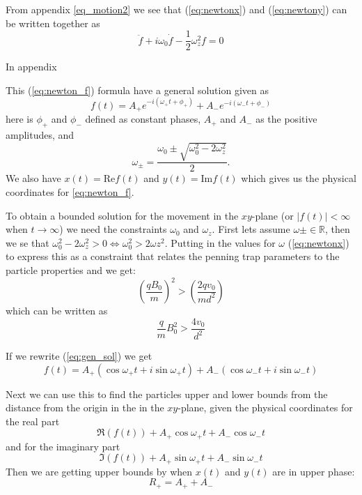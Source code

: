 \documentclass[english,notitlepage,reprint,nofootinbib]{revtex4-1}  %
\begin{document}
From appendix \ref{eq_motion2} we see that (\ref{eq:newtonx}) and (\ref{eq:newtony}) can be written together as 
\begin{equation} \label{eq:newton_f}
	\ddot{f} + i \omega_0 \dot{f} - \frac{1}{2} \omega_z^2 f = 0
\end{equation}

In appendix 


This (\ref{eq:newton_f}) formula have a general solution given as
\begin{equation} \label{eq:gen_sol}
	f(t) = A_+ e^{-i(\omega_+ t + \phi_+)} + A_- e^{-i(\omega_- t + \phi_-)}
\end{equation}
here is $\phi_+$ and $\phi_-$ defined as constant phases, $A_+$ and $A_-$ as the positive amplitudes, and 
\begin{equation*}
	\omega_\pm = \frac{\omega_0 \pm \sqrt{\omega_0^2 - 2\omega_z^2}}{2}.
\end{equation*}
We also have $x(t) = \text{Re} f(t)$ and $y(t) = \text{Im} f(t)$ which gives us the physical coordinates for \ref{eq:newton_f}.

To obtain a bounded solution for the movement in the $xy$-plane (or $|f(t)| < \infty$ when $t\to\infty$) we need the constraints $\omega_0$ and $\omega_z$. First lets assume $\omega \pm \in \mathbb{R}$, then we se that
$\omega_0^2 - 2 \omega_z^2 > 0 \Leftrightarrow \omega_0^2 > 2 \omega z^2$.
Putting in the values for $\omega$ (\ref{eq:newtonx}) to express this as a constraint that relates the penning trap parameters to the particle properties and we get:
\begin{equation*}
	\left( \frac{q B_0}{m} \right) ^2 > \left( \frac{2 q v_0}{m d^2} \right)
\end{equation*}
which can be written as
\begin{equation*}
	\frac{q}{m} B_0^2 > \frac{4 v_0}{d^2} 
\end{equation*}

If we rewrite (\ref{eq:gen_sol}) we get
\begin{equation*}
	f(t) = A_+ (\cos \omega_+ t + i \sin \omega_+ t) + A_- (\cos \omega_- t + i \sin \omega_- t)
\end{equation*}

Next we can use this to find the particles upper and lower bounds from the distance from the origin in the in the $xy$-plane, given the physical coordinates for the real part
\begin{equation*} 
	\Re \left( f(t) \right) + A_+ \cos \omega_+ t + A_- \cos \omega_- t
\end{equation*}
and for the imaginary part
\begin{equation*}
	\Im \left( f(t) \right) + A_+ \sin \omega_+ t + A_- \sin \omega_- t
\end{equation*}
Then we are getting upper bounds by when $x(t)$ and $y(t)$ are in upper phase:
\begin{equation*}
	R_+ = A_+ + A_-
\end{equation*}
\end{document}
